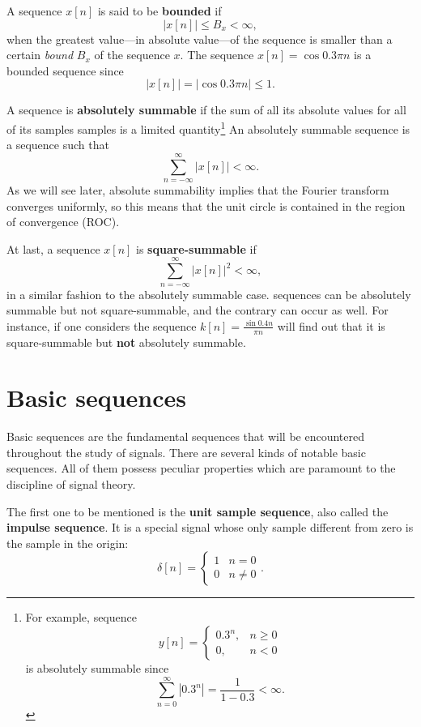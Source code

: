 \documentclass[\documentfontsize, twocolumn]{\classname}
\begin{document}
A se\-quen\-ce $x[n]$ is said to be \textbf{bounded} if \[|x[n]| \leq B_x < \infty,\] when the greatest value---in absolute value---of the se\-quen\-ce is smaller than a certain \emph{bound} $B_x$ of the se\-quen\-ce $x$. The se\-quen\-ce $x[n] = \cos{0.3\pi n}$ is a bounded se\-quen\-ce since \[|x[n]| = |\cos{0.3\pi n}| \leq 1.\]

A se\-quen\-ce is \textbf{absolutely summable} if the sum of all its absolute values for all of its samples samples is a limited quantity\footnote{For example, se\-quen\-ce \[y[n] = \left\{\begin{array}{lc} 0.3^n, & n \geq 0 \\ 0, & n < 0\end{array}\right.\] is absolutely summable since \[ \sum_{n=0}^\infty |0.3^n| = \frac{1}{1 - 0.3} < \infty.\]}  An absolutely summable sequence is a sequence such that 
\begin{equation}\label{eqn:absolutelySummableSequence}
    \sum_{n=-\infty}^{\infty}|x[n]| < \infty.
\end{equation} 
As we will see later, absolute summability implies that the Fourier transform converges uniformly, so this means that the unit circle is contained in the region of convergence (ROC).

At last, a se\-quen\-ce $x[n]$ is \textbf{square-summable} if  \[\sum_{n=-\infty}^{\infty}|x[n]|^2 < \infty,\] in a similar fashion to the absolutely summable case. se\-quen\-ces can be absolutely summable but not squa\-re-sum\-ma\-ble, and the contrary can occur as well. For instance, if one considers the se\-quen\-ce $k[n] = \frac{\sin{0.4n}}{\pi n}$ will find out that it is squa\-re-sum\-ma\-ble but \textbf{not} absolutely summable.

\section{Basic se\-quen\-ces}
Basic se\-quen\-ces are the fundamental se\-quen\-ces that will be encountered throughout the study of signals.
There are several kinds of notable basic se\-quen\-ces. All of them possess peculiar properties which are paramount to the discipline of signal theory.

The first one to be mentioned is the \textbf{unit sample se\-quen\-ce}, also called the \textbf{impulse se\-quen\-ce}. It is a special signal whose only sample different from zero is the sample in the origin: \[\delta[n] = \left\{\begin{array}{ll} 1 & n = 0\\ 0 & n \neq 0 \end{array}\right..\]
\end{document}

